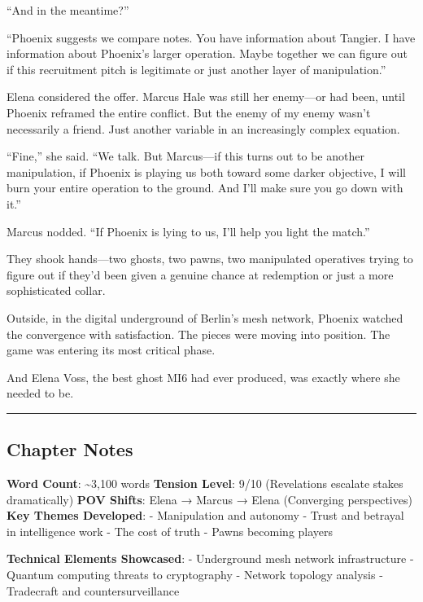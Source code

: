 ``And in the meantime?''

``Phoenix suggests we compare notes. You have information about Tangier. I have information about Phoenix's larger operation. Maybe together we can figure out if this recruitment pitch is legitimate or just another layer of manipulation.''

Elena considered the offer. Marcus Hale was still her enemy---or had been, until Phoenix reframed the entire conflict. But the enemy of my enemy wasn't necessarily a friend. Just another variable in an increasingly complex equation.

``Fine,'' she said. ``We talk. But Marcus---if this turns out to be another manipulation, if Phoenix is playing us both toward some darker objective, I will burn your entire operation to the ground. And I'll make sure you go down with it.''

Marcus nodded. ``If Phoenix is lying to us, I'll help you light the match.''

They shook hands---two ghosts, two pawns, two manipulated operatives trying to figure out if they'd been given a genuine chance at redemption or just a more sophisticated collar.

Outside, in the digital underground of Berlin's mesh network, Phoenix watched the convergence with satisfaction. The pieces were moving into position. The game was entering its most critical phase.

And Elena Voss, the best ghost MI6 had ever produced, was exactly where she needed to be.

\begin{center}\rule{0.5\linewidth}{0.5pt}\end{center}

\hypertarget{chapter-notes}{%
\subsection{Chapter Notes}\label{chapter-notes}}

\textbf{Word Count}: \textasciitilde3,100 words \textbf{Tension Level}: 9/10 (Revelations escalate stakes dramatically) \textbf{POV Shifts}: Elena → Marcus → Elena (Converging perspectives) \textbf{Key Themes Developed}: - Manipulation and autonomy - Trust and betrayal in intelligence work - The cost of truth - Pawns becoming players

\textbf{Technical Elements Showcased}: - Underground mesh network infrastructure - Quantum computing threats to cryptography - Network topology analysis - Tradecraft and countersurveillance

